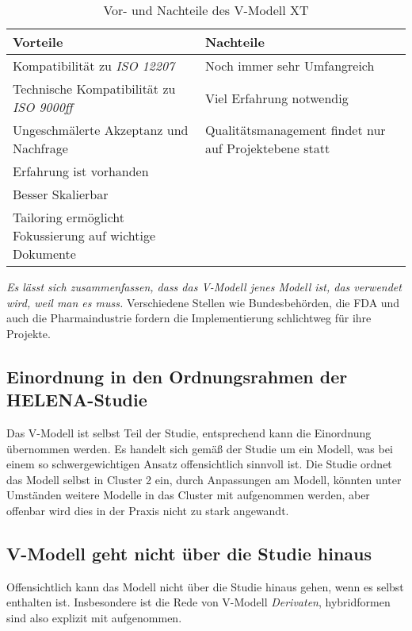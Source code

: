 \begin{table}[H]
    \centering
    \begin{tabulary}{0.9\textwidth}{|p{0.45\textwidth}|p{0.45\textwidth}|}
    \hline 
     Vorteile & Nachteile \\ 
    \hline 
    Kompatibilität zu \textit{ISO 12207} & Noch immer sehr Umfangreich \\
    \hline 
    Technische Kompatibilität zu \textit{ISO 9000ff} & Viel Erfahrung notwendig \\
    \hline
    Ungeschmälerte Akzeptanz und Nachfrage & Qualitätsmanagement findet nur auf Projektebene statt \\
    \hline
    Erfahrung ist vorhanden &  \\ 
    \hline
    Besser Skalierbar &  \\ 
    \hline
    Tailoring ermöglicht Fokussierung auf wichtige Dokumente &  \\
    \hline
    \end{tabulary} 
    \caption[Vor- und Nachteile des V-Modell XT]{Vor- und Nachteile des V-Modell XT}
    \label{tabelle_VModellXTVorNachteile}
\end{table}

\textit{Es lässt sich zusammenfassen, dass das V-Modell jenes Modell ist, das verwendet wird, weil man es muss.} Verschiedene Stellen wie Bundesbehörden, die FDA und auch die Pharmaindustrie fordern die Implementierung schlichtweg für ihre Projekte.

\subsection{Einordnung in den Ordnungsrahmen der HELENA-Studie}
Das V-Modell ist selbst Teil der Studie, entsprechend kann die Einordnung übernommen werden. Es handelt sich gemäß der Studie um ein Modell, was bei einem so schwergewichtigen Ansatz offensichtlich sinnvoll ist. Die Studie ordnet das Modell selbst in Cluster 2 ein, durch Anpassungen am Modell, könnten unter Umständen weitere Modelle in das Cluster mit aufgenommen werden, aber offenbar wird dies in der Praxis nicht zu stark angewandt.

\subsection{V-Modell geht nicht über die Studie hinaus}
Offensichtlich kann das Modell nicht über die Studie hinaus gehen, wenn es selbst enthalten ist. Insbesondere ist die Rede von V-Modell \textit{Derivaten}, hybridformen sind also explizit mit aufgenommen.